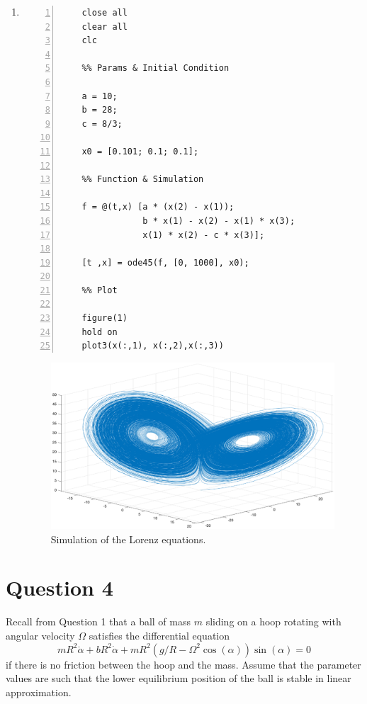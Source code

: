\documentclass[twoside,10pt,a4paper]{article}
\begin{document}
\begin{enumerate}[label=(\alph*)]
\item
\begin{Verbatim}[numbers = left]
	%% Initiate Script
	close all
	clear all
	clc
	
	%% Params & Initial Condition
	
	a = 10;
	b = 28;
	c = 8/3;
	
	x0 = [0.101; 0.1; 0.1];
	
	%% Function & Simulation
	
	f = @(t,x) [a * (x(2) - x(1));
	            b * x(1) - x(2) - x(1) * x(3);
	            x(1) * x(2) - c * x(3)];
	        
	[t ,x] = ode45(f, [0, 1000], x0);
	
	%% Plot
	
	figure(1)
	hold on
	plot3(x(:,1), x(:,2),x(:,3))
\end{Verbatim}

\newpage

\begin{figure}[H]
	\centering
	\includegraphics[scale=0.48]{Graphics/S03D01.eps}
	\caption{Simulation of the Lorenz equations.}
\end{figure}

\end{enumerate}

\newpage

\section*{Question 4}
Recall from Question 1 that a ball of mass $m$ sliding on a hoop rotating with angular velocity $\Omega$ satisfies the differential equation
\begin{equation}\label{Q04E01}
	mR^2 \ddot{\alpha} + bR^2 \dot{\alpha} + mR^2(g/R - \Omega^2 \cos(\alpha)) \sin(\alpha) = 0
\end{equation}
if there is no friction between the hoop and the mass. Assume that the parameter values are such that the lower equilibrium position of the ball is stable in linear approximation.
\end{document}
